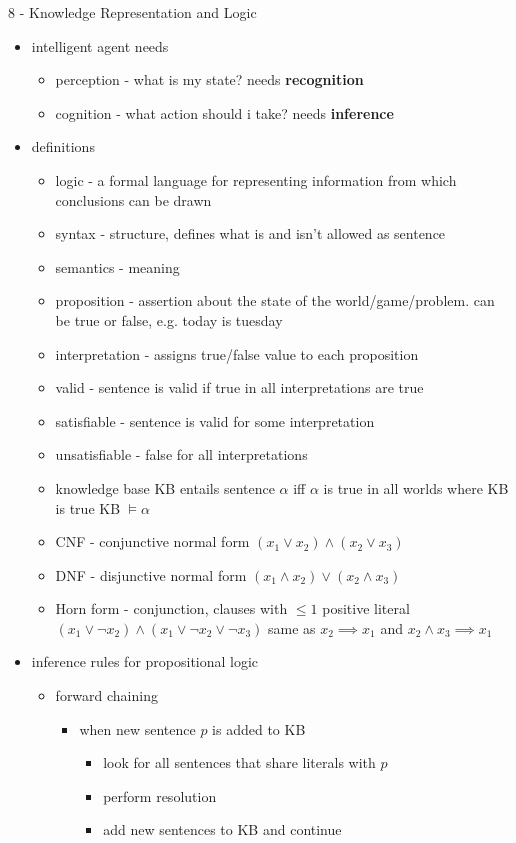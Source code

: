 \documentclass[11pt]{article}
\newcommand{\ee}[1]{\ensuremath{#1}}
\begin{document}
\begin{description}
\item 8 - Knowledge Representation and Logic
\begin{itemize}
	\item intelligent agent needs
	\begin{itemize}
		\item perception - what is my state? needs \textbf{recognition}
		\item cognition - what action should i take? needs \textbf{inference}
	\end{itemize}
	\item definitions
	\begin{itemize}
		\item logic - a formal language for representing information from which conclusions can be drawn
		\item syntax - structure, defines what is and isn't allowed as sentence
		\item semantics - meaning
		\item proposition - assertion about the state of the world/game/problem.
		\subitem can be true or false, e.g. today is tuesday
		\item interpretation - assigns true/false value to each proposition
		\item valid - sentence is valid if true in all interpretations are true
		\item satisfiable - sentence is valid for some interpretation
		\item unsatisfiable - false for all interpretations
		\item knowledge base KB entails sentence \ee{\alpha} iff \ee{\alpha} is true in all worlds where KB is true
		\subitem KB \ee{\vDash \alpha}
		\item CNF - conjunctive normal form
		\subitem \ee{(x_1 \vee x_2) \wedge (x_2 \vee x_3)}
		\item DNF - disjunctive normal form
		\subitem \ee{(x_1 \wedge x_2) \vee (x_2 \wedge x_3)}
		\item Horn form - conjunction, clauses with \ee{\leq 1} positive literal 
		\subitem \ee{(x_1 \vee \lnot x_2) \wedge (x_1 \vee \lnot x_2 \vee \lnot x_3)}
		\subitem same as \ee{x_2 \implies x_1} and \ee{x_2 \wedge x_3 \implies x_1}
	\end{itemize}
	\item inference rules for propositional logic
	\begin{itemize}
		\item forward chaining
		\begin{itemize}
			\item when new sentence \ee{p} is added to KB
			\begin{itemize}
				\item look for all sentences that share literals with \ee{p}
				\item perform resolution
				\item add new sentences to KB and continue
			\end{itemize}
		\end{itemize}
	

\end{itemize}
\end{itemize}
\end{description}
\end{document}
